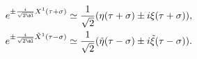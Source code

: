 \begin{equation}
\begin{split}
 e^{ \pm \frac{i}{\sqrt{2 \al}} X^1 (\tau + \sigma)} &\simeq
 \frac{1}{\sqrt2} ( \eta (\tau + \sigma) \pm i \xi (\tau + \sigma) )
 , \\
 e^ {\pm \frac{i}{\sqrt{2 \al}} \tilde X^1 (\tau - \sigma) } &\simeq
 \frac{1}{\sqrt2} ( \tilde \eta (\tau - \sigma) 
   \pm i \tilde \xi (\tau - \sigma) ) .
\end{split}
\end{equation}


